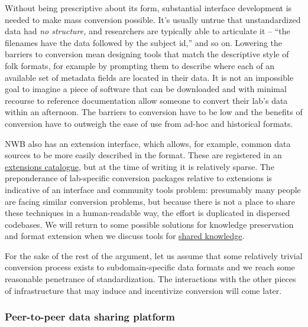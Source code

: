 \documentclass[10pt]{article}
\begin{document}
\begin{multicols}{2}
Without being prescriptive about its form, substantial interface
development is needed to make mass conversion possible. It's usually
untrue that unstandardized data had \emph{no structure,} and researchers
are typically able to articulate it -- ``the filenames have the data
followed by the subject id,'' and so on. Lowering the barriers to
conversion mean designing tools that match the descriptive style of folk
formats, for example by prompting them to describe where each of an
available set of metadata fields are located in their data. It is not an
impossible goal to imagine a piece of software that can be downloaded
and with minimal recourse to reference documentation allow someone to
convert their lab's data within an afternoon. The barriers to conversion
have to be low and the benefits of conversion have to outweigh the ease
of use from ad-hoc and historical formats.

NWB also has an extension interface, which allows, for example, common
data sources to be more easily described in the format. These are
registered in an \href{https://nwb-extensions.github.io/}{extensions
catalogue}, but at the time of writing it is relatively sparse. The
preponderance of lab-specific conversion packages relative to extensions
is indicative of an interface and community tools problem: presumably
many people are facing similar conversion problems, but because there is
not a place to share these techniques in a human-readable way, the
effort is duplicated in dispersed codebases. We will return to some
possible solutions for knowledge preservation and format extension when
we discuss tools for \protect\hyperlink{shared-knowledge}{shared
knowledge}.

For the sake of the rest of the argument, let us assume that some
relatively trivial conversion process exists to subdomain-specific data
formats and we reach some reasonable penetrance of standardization. The
interactions with the other pieces of infrastructure that may induce and
incentivize conversion will come later.

\hypertarget{peer-to-peer-data-sharing-platform}{%
\subsubsection{Peer-to-peer data sharing
platform}\label{peer-to-peer-data-sharing-platform}}


\end{multicols}
\end{document}
